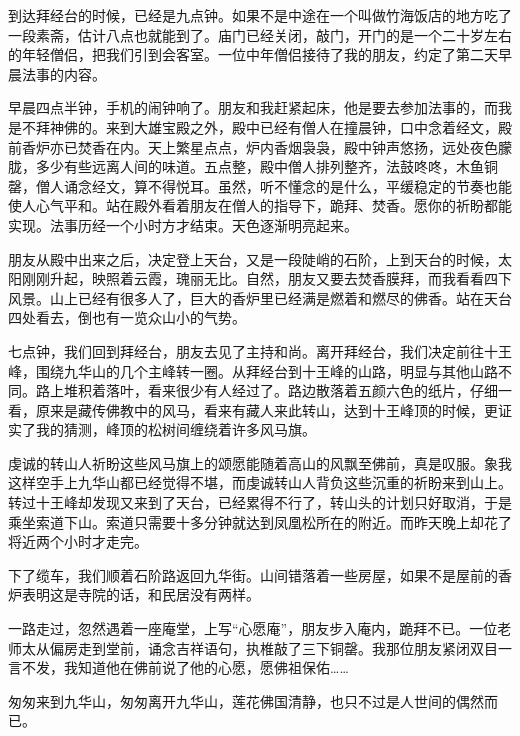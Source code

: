 到达拜经台的时候，已经是九点钟。如果不是中途在一个叫做竹海饭店的地方吃了一段素斋，估计八点也就能到了。庙门已经关闭，敲门，开门的是一个二十岁左右的年轻僧侣，把我们引到会客室。一位中年僧侣接待了我的朋友，约定了第二天早晨法事的内容。

早晨四点半钟，手机的闹钟响了。朋友和我赶紧起床，他是要去参加法事的，而我是不拜神佛的。来到大雄宝殿之外，殿中已经有僧人在撞晨钟，口中念着经文，殿前香炉亦已焚香在内。天上繁星点点，炉内香烟袅袅，殿中钟声悠扬，远处夜色朦胧，多少有些远离人间的味道。五点整，殿中僧人排列整齐，法鼓咚咚，木鱼铜罄，僧人诵念经文，算不得悦耳。虽然，听不懂念的是什么，平缓稳定的节奏也能使人心气平和。站在殿外看着朋友在僧人的指导下，跪拜、焚香。愿你的祈盼都能实现。法事历经一个小时方才结束。天色逐渐明亮起来。

朋友从殿中出来之后，决定登上天台，又是一段陡峭的石阶，上到天台的时候，太阳刚刚升起，映照着云霞，瑰丽无比。自然，朋友又要去焚香膜拜，而我看看四下风景。山上已经有很多人了，巨大的香炉里已经满是燃着和燃尽的佛香。站在天台四处看去，倒也有一览众山小的气势。

七点钟，我们回到拜经台，朋友去见了主持和尚。离开拜经台，我们决定前往十王峰，围绕九华山的几个主峰转一圈。从拜经台到十王峰的山路，明显与其他山路不同。路上堆积着落叶，看来很少有人经过了。路边散落着五颜六色的纸片，仔细一看，原来是藏传佛教中的风马，看来有藏人来此转山，达到十王峰顶的时候，更证实了我的猜测，峰顶的松树间缠绕着许多风马旗。

虔诚的转山人祈盼这些风马旗上的颂愿能随着高山的风飘至佛前，真是叹服。象我这样空手上九华山都已经觉得不堪，而虔诚转山人背负这些沉重的祈盼来到山上。转过十王峰却发现又来到了天台，已经累得不行了，转山头的计划只好取消，于是乘坐索道下山。索道只需要十多分钟就达到凤凰松所在的附近。而昨天晚上却花了将近两个小时才走完。

下了缆车，我们顺着石阶路返回九华街。山间错落着一些房屋，如果不是屋前的香炉表明这是寺院的话，和民居没有两样。

一路走过，忽然遇着一座庵堂，上写“心愿庵”，朋友步入庵内，跪拜不已。一位老师太从偏房走到堂前，诵念吉祥语句，执椎敲了三下铜罄。我那位朋友紧闭双目一言不发，我知道他在佛前说了他的心愿，愿佛祖保佑……

匆匆来到九华山，匆匆离开九华山，莲花佛国清静，也只不过是人世间的偶然而已。
